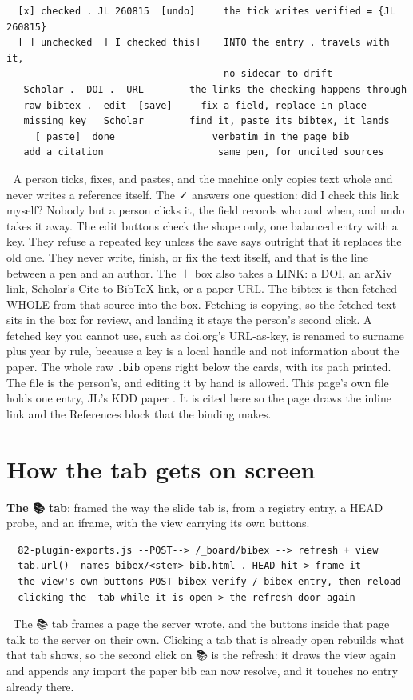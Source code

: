 \begin{verbatim}
  [x] checked . JL 260815  [undo]     the tick writes verified = {JL 260815}
  [ ] unchecked  [ I checked this]    INTO the entry . travels with it,
                                      no sidecar to drift
   Scholar .  DOI .  URL        the links the checking happens through
   raw bibtex .  edit  [save]     fix a field, replace in place
   missing key   Scholar        find it, paste its bibtex, it lands
     [ paste]  done                 verbatim in the page bib
   add a citation                    same pen, for uncited sources
\end{verbatim}
📌 A person ticks, fixes, and pastes, and the machine only copies text whole and never writes a reference itself. The ✓ answers one question: did I check this link myself? Nobody but a person clicks it, the field records who and when, and undo takes it away. The edit buttons check the shape only, one balanced entry with a key. They refuse a repeated key unless the save says outright that it replaces the old one. They never write, finish, or fix the text itself, and that is the line between a pen and an author. The ＋ box also takes a LINK: a DOI, an arXiv link, Scholar's Cite to BibTeX link, or a paper URL. The bibtex is then fetched WHOLE from that source into the box. Fetching is copying, so the fetched text sits in the box for review, and landing it stays the person's second click. A fetched key you cannot use, such as doi.org's URL-as-key, is renamed to surname plus year by rule, because a key is a local handle and not information about the paper. The whole raw \texttt{.bib} opens right below the cards, with its path printed. The file is the person's, and editing it by hand is allowed. This page's own file holds one entry, JL's KDD paper \citep{luo2026eventglucose}. It is cited here so the page draws the inline link and the References block that the binding makes.


\section{How the tab gets on screen}
\textbf{The 📚 tab}: framed the way the slide tab is, from a registry entry, a HEAD probe, and an iframe, with the view carrying its own buttons.

\begin{verbatim}
  82-plugin-exports.js --POST--> /_board/bibex --> refresh + view
  tab.url()  names bibex/<stem>-bib.html . HEAD hit > frame it
  the view's own buttons POST bibex-verify / bibex-entry, then reload
  clicking the  tab while it is open > the refresh door again
\end{verbatim}
📌 The 📚 tab frames a page the server wrote, and the buttons inside that page talk to the server on their own. Clicking a tab that is already open rebuilds what that tab shows, so the second click on 📚 is the refresh: it draws the view again and appends any import the paper bib can now resolve, and it touches no entry already there.

